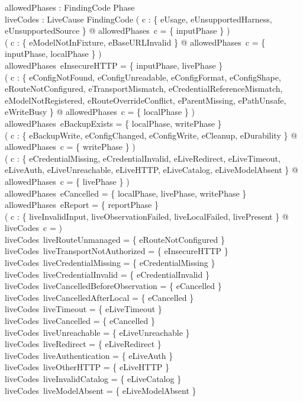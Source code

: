\documentclass{article}
\begin{document}
\begin{axdef}
	allowedPhases : FindingCode \fun \power Phase \\
	liveCodes : LiveCause \fun \power FindingCode
	\where
	( \forall c : \{ eUsage, eUnsupportedHarness, eUnsupportedSource \} @
	allowedPhases~c = \{ inputPhase \} ) \\
	( \forall c : \{ eModelNotInFixture, eBaseURLInvalid \} @
	allowedPhases~c = \{ inputPhase, localPhase \} ) \\
	allowedPhases~eInsecureHTTP = \{ inputPhase, livePhase \} \\
	( \forall c : \{ eConfigNotFound, eConfigUnreadable, eConfigFormat,
	eConfigShape, eRouteNotConfigured, eTransportMismatch,
	eCredentialReferenceMismatch, eModelNotRegistered,
	eRouteOverrideConflict, eParentMissing, ePathUnsafe, eWriteBusy \} @
	allowedPhases~c = \{ localPhase \} ) \\
	allowedPhases~eBackupExists = \{ localPhase, writePhase \} \\
	( \forall c : \{ eBackupWrite, eConfigChanged, eConfigWrite, eCleanup,
	eDurability \} @ allowedPhases~c = \{ writePhase \} ) \\
	( \forall c : \{ eCredentialMissing, eCredentialInvalid, eLiveRedirect,
	eLiveTimeout, eLiveAuth, eLiveUnreachable, eLiveHTTP, eLiveCatalog,
	eLiveModelAbsent \} @ allowedPhases~c = \{ livePhase \} ) \\
	allowedPhases~eCancelled = \{ localPhase, livePhase, writePhase \} \\
	allowedPhases~eReport = \{ reportPhase \} \\
	( \forall c : \{ liveInvalidInput, liveObservationFailed,
	liveLocalFailed, livePresent \} @
	liveCodes~c = \emptyset ) \\
	liveCodes~liveRouteUnmanaged = \{ eRouteNotConfigured \} \\
	liveCodes~liveTransportNotAuthorized = \{ eInsecureHTTP \} \\
	liveCodes~liveCredentialMissing = \{ eCredentialMissing \} \\
	liveCodes~liveCredentialInvalid = \{ eCredentialInvalid \} \\
	liveCodes~liveCancelledBeforeObservation = \{ eCancelled \} \\
	liveCodes~liveCancelledAfterLocal = \{ eCancelled \} \\
	liveCodes~liveTimeout = \{ eLiveTimeout \} \\
	liveCodes~liveCancelled = \{ eCancelled \} \\
	liveCodes~liveUnreachable = \{ eLiveUnreachable \} \\
	liveCodes~liveRedirect = \{ eLiveRedirect \} \\
	liveCodes~liveAuthentication = \{ eLiveAuth \} \\
	liveCodes~liveOtherHTTP = \{ eLiveHTTP \} \\
	liveCodes~liveInvalidCatalog = \{ eLiveCatalog \} \\
	liveCodes~liveModelAbsent = \{ eLiveModelAbsent \}
\end{axdef}
\end{document}
